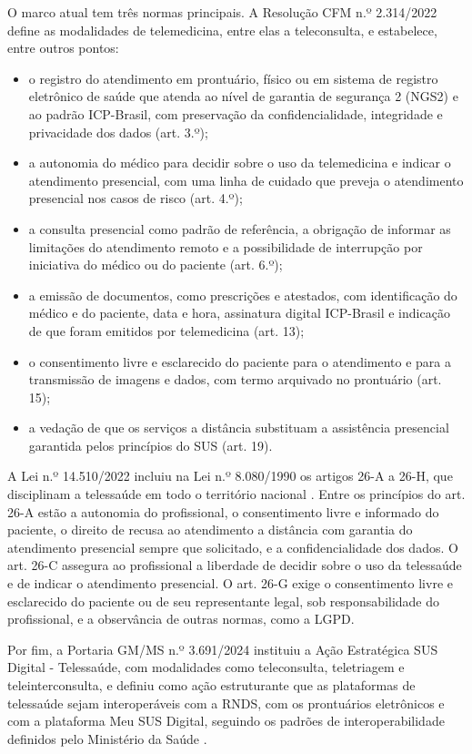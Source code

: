 O marco atual tem três normas principais. A Resolução CFM n.º 2.314/2022 \cite{cfm2314} define as modalidades de telemedicina, entre elas a teleconsulta, e estabelece, entre outros pontos:
\begin{itemize}
    \item o registro do atendimento em prontuário, físico ou em sistema de registro eletrônico de saúde que atenda ao nível de garantia de segurança 2 (NGS2) e ao padrão ICP-Brasil, com preservação da confidencialidade, integridade e privacidade dos dados (art. 3.º);
    \item a autonomia do médico para decidir sobre o uso da telemedicina e indicar o atendimento presencial, com uma linha de cuidado que preveja o atendimento presencial nos casos de risco (art. 4.º);
    \item a consulta presencial como padrão de referência, a obrigação de informar as limitações do atendimento remoto e a possibilidade de interrupção por iniciativa do médico ou do paciente (art. 6.º);
    \item a emissão de documentos, como prescrições e atestados, com identificação do médico e do paciente, data e hora, assinatura digital ICP-Brasil e indicação de que foram emitidos por telemedicina (art. 13);
    \item o consentimento livre e esclarecido do paciente para o atendimento e para a transmissão de imagens e dados, com termo arquivado no prontuário (art. 15);
    \item a vedação de que os serviços a distância substituam a assistência presencial garantida pelos princípios do SUS (art. 19).
\end{itemize}

A Lei n.º 14.510/2022 incluiu na Lei n.º 8.080/1990 os artigos 26-A a 26-H, que disciplinam a telessaúde em todo o território nacional \cite{lei14510}. Entre os princípios do art. 26-A estão a autonomia do profissional, o consentimento livre e informado do paciente, o direito de recusa ao atendimento a distância com garantia do atendimento presencial sempre que solicitado, e a confidencialidade dos dados. O art. 26-C assegura ao profissional a liberdade de decidir sobre o uso da telessaúde e de indicar o atendimento presencial. O art. 26-G exige o consentimento livre e esclarecido do paciente ou de seu representante legal, sob responsabilidade do profissional, e a observância de outras normas, como a LGPD.

Por fim, a Portaria GM/MS n.º 3.691/2024 instituiu a Ação Estratégica SUS Digital - Telessaúde, com modalidades como teleconsulta, teletriagem e teleinterconsulta, e definiu como ação estruturante que as plataformas de telessaúde sejam interoperáveis com a RNDS, com os prontuários eletrônicos e com a plataforma Meu SUS Digital, seguindo os padrões de interoperabilidade definidos pelo Ministério da Saúde \cite{portaria3691}.

